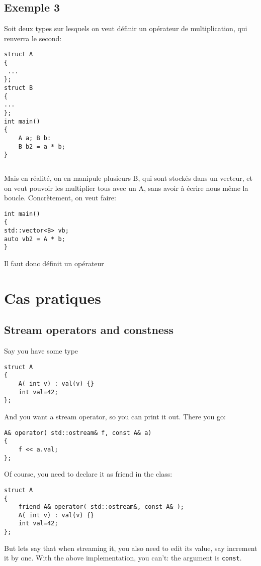\documentclass[11pt,a4paper]{article}
\begin{document}
\subsection{Exemple 3}

Soit deux types sur lesquels on veut définir un opérateur de multiplication, qui renverra le second:
\begin{lstlisting}
struct A
{
 ...
};
struct B
{
...
};
int main()
{
	A a; B b:
	B b2 = a * b;
}
\end{lstlisting}

\begin{lstlisting}
\end{lstlisting}


Mais en réalité, on en manipule plusieurs B, qui sont stockés dans un vecteur, et on veut pouvoir les multiplier tous avec un A, sans avoir à écrire nous même la boucle.
Concrètement, on veut faire:
\begin{lstlisting}
int main()
{
std::vector<B> vb;
auto vb2 = A * b;
}
\end{lstlisting}

Il faut donc définit un opérateur

\section{Cas pratiques}

\subsection{Stream operators and constness}

Say you have some type
\begin{lstlisting}
struct A
{
	A( int v) : val(v) {}
	int val=42;
};
\end{lstlisting}

And you want a stream operator, so you can print it out.
There you go:

\begin{lstlisting}
A& operator( std::ostream& f, const A& a)
{
	f << a.val;
};
\end{lstlisting}

Of course, you need to declare it as friend in the class:
\begin{lstlisting}
struct A
{
	friend A& operator( std::ostream&, const A& );
	A( int v) : val(v) {}
	int val=42;
};
\end{lstlisting}

But lets say that when streaming it, you also need to edit its value, say increment it by one.
With the above implementation, you can't: the argument is {\tt const}.
\end{document}
